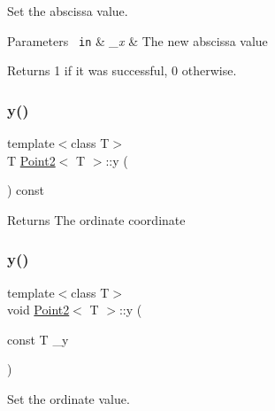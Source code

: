 Set the abscissa value. 


\begin{DoxyParams}[1]{Parameters}
\mbox{\texttt{ in}}  & {\em \+\_\+x} & The new abscissa value \\
\hline
\end{DoxyParams}
\begin{DoxyReturn}{Returns}
1 if it was successful, 0 otherwise. 
\end{DoxyReturn}
\mbox{\label{class_point2_ad7138ca15abc7937b9b1fdb0a84d229c}} 
\subsubsection{\texorpdfstring{y()}{y()}\hspace{0.1cm}{\footnotesize\ttfamily [1/2]}}
{\footnotesize\ttfamily template$<$class T$>$ \\
T \mbox{\hyperlink{class_point2}{Point2}}$<$ T $>$\+::y (\begin{DoxyParamCaption}{ }\end{DoxyParamCaption}) const\hspace{0.3cm}{\ttfamily [inline]}}

\begin{DoxyReturn}{Returns}
The ordinate coordinate 
\end{DoxyReturn}
\mbox{\label{class_point2_a967025762c1b4dede5eb822f5c29522e}} 
\subsubsection{\texorpdfstring{y()}{y()}\hspace{0.1cm}{\footnotesize\ttfamily [2/2]}}
{\footnotesize\ttfamily template$<$class T$>$ \\
void \mbox{\hyperlink{class_point2}{Point2}}$<$ T $>$\+::y (\begin{DoxyParamCaption}\item[{const T}]{\+\_\+y }\end{DoxyParamCaption})\hspace{0.3cm}{\ttfamily [inline]}}



Set the ordinate value. 


